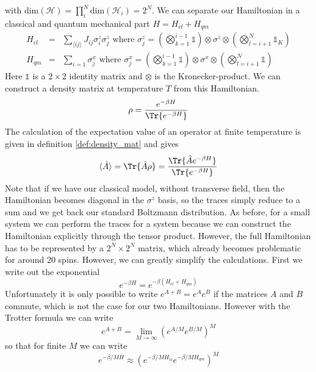 with $\text{dim}(\mathcal{H})= \prod_i^N \text{dim}(\mathcal{H}_i) = 2^N$.
We can separate our Hamiltonian in a classical and quantum mechanical part $H = H_{cl}+H_{qm}$
\begin{eqnarray}
    H_{cl} &=& \sum_{\langle ij \rangle} J_{ij} \sigma_i^z\sigma_j^z \text{ where } \sigma_j^z = \left( \bigotimes_{k=1}^{i-1}\mathbb{1} \right)\otimes\sigma^z\otimes\left(\bigotimes_{l=i+1}^{N}\mathbb{1}_K\right)\nonumber\\
    H_{qm}&=&\sum_{i=1} \sigma_j^x \text{ where }\sigma_j^x = \left( \bigotimes_{k=1}^{i-1}\mathbb{1} \right)\otimes\sigma^x\otimes\left(\bigotimes_{l=i+1}^{N}\mathbb{1}\right)\nonumber
\end{eqnarray}
Here $\mathbb{1}$ is a $2\times2$ identity matrix and $\otimes$ is the Kronecker-product. We can construct a density matrix at temperature $T$ from this Hamiltonian.
\begin{equation*}
    \rho = \frac{e^{-\beta H }}{\Tr{e^{-\beta H }}}
\end{equation*}
The calculation of the expectation value of an operator at finite temperature is given in definition \ref{def:density_mat} and gives
\begin{equation}
    \langle \hat{A} \rangle = \Tr{\hat{A}\rho}=\frac{\Tr{\hat{A} e^{-\beta H }}}{\Tr{e^{-\beta H }}}
\end{equation}
Note that if we have our classical model, without transverse field, then the Hamiltonian becomes diagonal in the $\sigma^z$ basis, so the traces simply reduce to a sum and we get back our standard Boltzmann distribution. As before, for a small system we can perform the traces for a system because we can construct the Hamiltonian explicitly through the tensor product. However, the full Hamiltonian has to be represented by a $2^N\times2^N$ matrix, which already becomes problematic for around 20 spins. However, we can greatly simplify the calculations. First we write out the exponential
\begin{equation*}
    e^{-\beta H} = e^{-\beta (H_{cl}+H_{qm})}
\end{equation*}
Unfortunately it is only possible to write $e^{A+B} = e^A e^B$ if the matrices $A$ and $B$ commute, which is not the case for our two Hamiltonians. However with the Trotter formula we can write
\begin{equation*}
    e^{A+B} = \lim_{M\rightarrow\infty} \left( e^{A/M}e^{B/M} \right)^M
\end{equation*}  
so that for finite $M$ we can write
\begin{equation*}
e^{-\beta/M H} \approx \left(e^{-\beta/M H_{cl}}e^{-\beta/M H_{qm}}\right)^M
\end{equation*}
